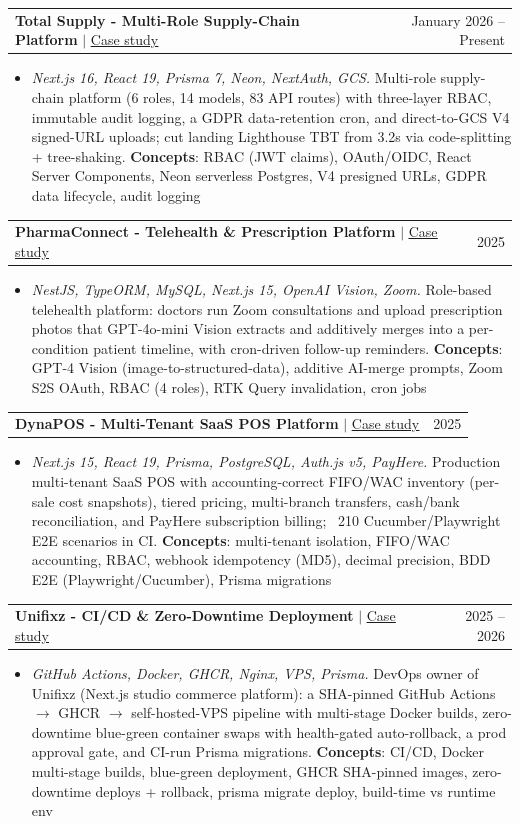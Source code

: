 \documentclass[letterpaper,10pt]{article}
\makeatletter
\newcommand{\resumeItem}[1]{
  \item\small{
    {#1 \vspace{-2pt}}
  }
}
\newcommand{\resumeProjectHeading}[2]{
    \item
    \begin{tabular*}{0.97\textwidth}{l@{\extracolsep{\fill}}r}
      \small#1 & #2 \\
    \end{tabular*}\vspace{-7pt}
}
\newcommand{\resumeItemListStart}{\begin{itemize}}
\newcommand{\resumeItemListEnd}{\end{itemize}\vspace{-5pt}}
\makeatother
\begin{document}
      \resumeProjectHeading
          {\textbf{Total Supply - Multi-Role Supply-Chain Platform} $|$ \href{https://ifham.dev/projects/total-supply}{\underline{Case study}}}{January 2026 -- Present}
          \resumeItemListStart
            \resumeItem{\emph{Next.js 16, React 19, Prisma 7, Neon, NextAuth, GCS.} Multi-role supply-chain platform (6 roles, 14 models, 83 API routes) with three-layer RBAC, immutable audit logging, a GDPR data-retention cron, and direct-to-GCS V4 signed-URL uploads; cut landing Lighthouse TBT from 3.2s via code-splitting + tree-shaking. \textbf{Concepts}: RBAC (JWT claims), OAuth/OIDC, React Server Components, Neon serverless Postgres, V4 presigned URLs, GDPR data lifecycle, audit logging}
          \resumeItemListEnd

      \resumeProjectHeading
          {\textbf{PharmaConnect - Telehealth \& Prescription Platform} $|$ \href{https://ifham.dev/projects/pharmaconnect}{\underline{Case study}}}{2025}
          \resumeItemListStart
            \resumeItem{\emph{NestJS, TypeORM, MySQL, Next.js 15, OpenAI Vision, Zoom.} Role-based telehealth platform: doctors run Zoom consultations and upload prescription photos that GPT-4o-mini Vision extracts and additively merges into a per-condition patient timeline, with cron-driven follow-up reminders. \textbf{Concepts}: GPT-4 Vision (image-to-structured-data), additive AI-merge prompts, Zoom S2S OAuth, RBAC (4 roles), RTK Query invalidation, cron jobs}
          \resumeItemListEnd

      \resumeProjectHeading
          {\textbf{DynaPOS - Multi-Tenant SaaS POS Platform} $|$ \href{https://ifham.dev/projects/dynapos}{\underline{Case study}}}{2025}
          \resumeItemListStart
            \resumeItem{\emph{Next.js 15, React 19, Prisma, PostgreSQL, Auth.js v5, PayHere.} Production multi-tenant SaaS POS with accounting-correct FIFO/WAC inventory (per-sale cost snapshots), tiered pricing, multi-branch transfers, cash/bank reconciliation, and PayHere subscription billing; ~210 Cucumber/Playwright E2E scenarios in CI. \textbf{Concepts}: multi-tenant isolation, FIFO/WAC accounting, RBAC, webhook idempotency (MD5), decimal precision, BDD E2E (Playwright/Cucumber), Prisma migrations}
          \resumeItemListEnd

      \resumeProjectHeading
          {\textbf{Unifixz - CI/CD \& Zero-Downtime Deployment} $|$ \href{https://ifham.dev/projects/unifixz}{\underline{Case study}}}{2025 -- 2026}
          \resumeItemListStart
            \resumeItem{\emph{GitHub Actions, Docker, GHCR, Nginx, VPS, Prisma.} DevOps owner of Unifixz (Next.js studio commerce platform): a SHA-pinned GitHub Actions $\to$ GHCR $\to$ self-hosted-VPS pipeline with multi-stage Docker builds, zero-downtime blue-green container swaps with health-gated auto-rollback, a prod approval gate, and CI-run Prisma migrations. \textbf{Concepts}: CI/CD, Docker multi-stage builds, blue-green deployment, GHCR SHA-pinned images, zero-downtime deploys + rollback, prisma migrate deploy, build-time vs runtime env}
          \resumeItemListEnd
\end{document}

